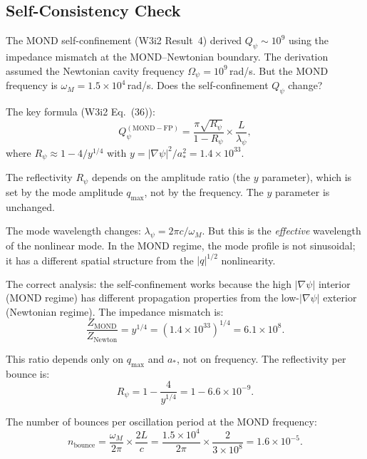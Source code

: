 \documentclass[11pt]{article}
\theoremstyle{definition}
\theoremstyle{remark}
\newcommand{\Qpsi}{Q_\psi}
\newcommand{\Opsi}{\Omega_\psi}
\newcommand{\astar}{a_*}
\begin{document}
\subsection{Self-Consistency Check}

The MOND self-confinement (W3i2 Result~4) derived $\Qpsi \sim 10^9$
using the impedance mismatch at the MOND--Newtonian boundary. The
derivation assumed the Newtonian cavity frequency $\Opsi = 10^9$\,rad/s.
But the MOND frequency is $\omega_M = 1.5 \times 10^4$\,rad/s. Does
the self-confinement $\Qpsi$ change?

The key formula (W3i2 Eq.~(36)):
\begin{equation}
\Qpsi^{(\mathrm{MOND-FP})} = \frac{\pi \sqrt{R_\psi}}{1 - R_\psi}
\times \frac{L}{\lambda_\psi},
\end{equation}
where $R_\psi \approx 1 - 4/y^{1/4}$ with $y = |\nabla\psi|^2/\astar^2
= 1.4 \times 10^{33}$.

The reflectivity $R_\psi$ depends on the amplitude ratio (the $y$
parameter), which is set by the mode amplitude $q_{\max}$, not by
the frequency. The $y$ parameter is unchanged.

The mode wavelength changes: $\lambda_\psi = 2\pi c / \omega_M$.
But this is the \emph{effective} wavelength of the nonlinear mode.
In the MOND regime, the mode profile is not sinusoidal; it has a
different spatial structure from the $|q|^{1/2}$ nonlinearity.

The correct analysis: the self-confinement works because the high
$|\nabla\psi|$ interior (MOND regime) has different propagation
properties from the low-$|\nabla\psi|$ exterior (Newtonian regime).
The impedance mismatch is:
\begin{equation}
\frac{Z_{\mathrm{MOND}}}{Z_{\mathrm{Newton}}} = y^{1/4}
= (1.4 \times 10^{33})^{1/4} = 6.1 \times 10^8.
\end{equation}

This ratio depends only on $q_{\max}$ and $\astar$, not on
frequency. The reflectivity per bounce is:
\begin{equation}
R_\psi = 1 - \frac{4}{y^{1/4}} = 1 - 6.6 \times 10^{-9}.
\end{equation}

The number of bounces per oscillation period at the MOND frequency:
\begin{equation}
n_{\mathrm{bounce}} = \frac{\omega_M}{2\pi} \times \frac{2L}{c}
= \frac{1.5 \times 10^4}{2\pi} \times \frac{2}{3 \times 10^8}
= 1.6 \times 10^{-5}.
\end{equation}
\end{document}
